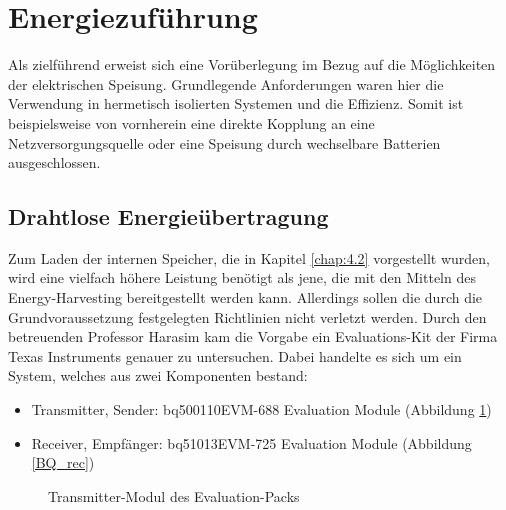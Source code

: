 \documentclass[12pt]{scrreprt} %
\begin{document}
\section{Energiezuführung}
Als zielführend erweist sich eine Vorüberlegung im Bezug auf die Möglichkeiten der elektrischen Speisung. Grundlegende Anforderungen waren hier die Verwendung in hermetisch isolierten Systemen und die Effizienz. Somit ist beispielsweise von vornherein eine direkte Kopplung an eine Netzversorgungsquelle oder eine Speisung durch wechselbare Batterien ausgeschlossen. 

\subsection{Drahtlose Energieübertragung}
\label{chap:4.1.2}
Zum Laden der internen Speicher, die in Kapitel \vref{chap:4.2} vorgestellt wurden, wird eine vielfach höhere Leistung benötigt als jene, die mit den Mitteln des Energy-Harvesting bereitgestellt werden kann. Allerdings sollen die durch die Grundvoraussetzung festgelegten Richtlinien nicht verletzt werden. Durch den betreuenden Professor Harasim kam die Vorgabe ein Evaluations-Kit der Firma Texas Instruments genauer zu untersuchen. Dabei handelte es sich um ein System, welches aus zwei Komponenten bestand:
\begin{itemize}
\item
Transmitter, Sender: bq500110EVM-688 Evaluation Module (Abbildung \ref{BQ_transm})
\item
Receiver, Empfänger: bq51013EVM-725 Evaluation Module (Abbildung \ref{BQ_rec})
\end{itemize}
\begin{figure}
\centering
{}
\caption{Transmitter-Modul des Evaluation-Packs}
\label{BQ_transm}
\end{figure}
\end{document}
